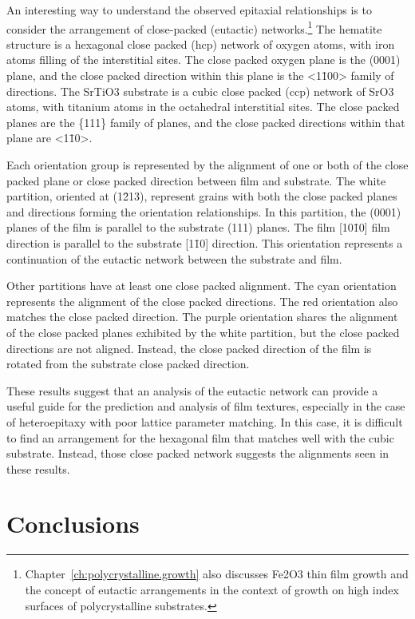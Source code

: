 \documentclass[12pt,%
              twoside,
               letterpaper]{uiothesis}
\begin{document}
An interesting way to understand the observed epitaxial relationships is to consider the
arrangement of close-packed (eutactic)\cite{OKeeffe:1977vx}
networks.\footnote{Chapter~\ref{ch:polycrystalline.growth} also discusses Fe2O3 thin film
growth and the concept of eutactic arrangements in the context of growth on high index
surfaces of polycrystalline substrates.} The hematite structure is a hexagonal close
packed (hcp) network of oxygen atoms, with iron atoms filling  of the
interstitial sites. The close packed oxygen plane is the (0001) plane, and the close
packed direction within this plane is the <1\={1}00> family of directions. The SrTiO3
substrate is a cubic close packed (ccp) network of SrO3 atoms, with titanium atoms in
 the octahedral interstitial sites. The close packed planes are the
\{111\} family of planes, and the close packed directions within that plane are <1\={1}0>.


Each orientation group is represented by the alignment of one or both of the close packed
plane or close packed direction between film and substrate. The white partition, oriented
at (1\={2}13), represent grains with both the close packed planes and directions forming
the orientation relationships. In this partition, the  (0001) planes of the film is
parallel to the substrate (111) planes. The film [10\={1}0] film direction is parallel to
the substrate [1\={1}0] direction. This orientation represents a continuation of the
eutactic network between the substrate and film.

Other partitions have at least one close packed alignment. The cyan orientation represents
the alignment of the close packed directions. The red orientation also matches the close
packed direction. The purple orientation shares the alignment of the close packed planes
exhibited by the white partition, but the close packed directions are not aligned.
Instead, the close packed direction of the film is rotated \degree{} from
the substrate close packed direction.

These results suggest that an analysis of the eutactic network can provide a useful guide
for the prediction and analysis of film textures, especially in the case of heteroepitaxy
with poor lattice parameter matching. In this case, it is difficult to find an
arrangement for the hexagonal film that matches well with the cubic substrate. Instead, those
close packed network suggests the alignments seen in these results.


\section{Conclusions}
\label{sec:single.growth.conclusions}
\end{document}
